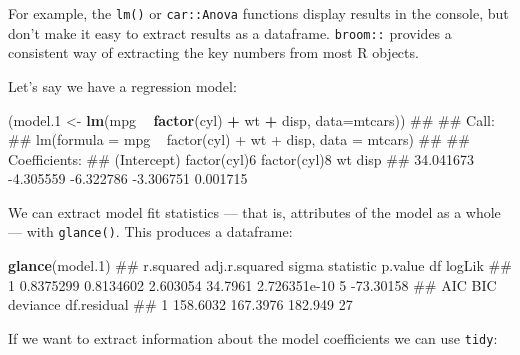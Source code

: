 \documentclass[]{article}
\newenvironment{Shaded}{\begin{snugshade}}{\end{snugshade}}
\newcommand{\KeywordTok}[1]{\textcolor[rgb]{0.13,0.29,0.53}{\textbf{#1}}}
\newcommand{\DataTypeTok}[1]{\textcolor[rgb]{0.13,0.29,0.53}{#1}}
\newcommand{\DecValTok}[1]{\textcolor[rgb]{0.00,0.00,0.81}{#1}}
\newcommand{\StringTok}[1]{\textcolor[rgb]{0.31,0.60,0.02}{#1}}
\newcommand{\OperatorTok}[1]{\textcolor[rgb]{0.81,0.36,0.00}{\textbf{#1}}}
\newcommand{\NormalTok}[1]{#1}
\theoremstyle{definition}
\theoremstyle{definition}
\theoremstyle{definition}
\theoremstyle{remark}
\begin{document}
For example, the \texttt{lm()} or \texttt{car::Anova} functions display
results in the console, but don't make it easy to extract results as a
dataframe. \texttt{broom::} provides a consistent way of extracting the
key numbers from most R objects.

Let's say we have a regression model:

\begin{Shaded}
\begin{Highlighting}[]
\NormalTok{(model.}\DecValTok{1}\NormalTok{ <-}\StringTok{ }\KeywordTok{lm}\NormalTok{(mpg }\OperatorTok{~}\StringTok{ }\KeywordTok{factor}\NormalTok{(cyl) }\OperatorTok{+}\StringTok{ }\NormalTok{wt }\OperatorTok{+}\StringTok{ }\NormalTok{disp, }\DataTypeTok{data=}\NormalTok{mtcars))}
\NormalTok{## }
\NormalTok{## Call:}
\NormalTok{## lm(formula = mpg ~ factor(cyl) + wt + disp, data = mtcars)}
\NormalTok{## }
\NormalTok{## Coefficients:}
\NormalTok{##  (Intercept)  factor(cyl)6  factor(cyl)8            wt          disp  }
\NormalTok{##    34.041673     -4.305559     -6.322786     -3.306751      0.001715}
\end{Highlighting}
\end{Shaded}

We can extract model fit statistics --- that is, attributes of the model
as a whole --- with \texttt{glance()}. This produces a dataframe:

\begin{Shaded}
\begin{Highlighting}[]
\KeywordTok{glance}\NormalTok{(model.}\DecValTok{1}\NormalTok{)}
\NormalTok{##   r.squared adj.r.squared    sigma statistic      p.value df    logLik}
\NormalTok{## 1 0.8375299     0.8134602 2.603054   34.7961 2.726351e-10  5 -73.30158}
\NormalTok{##        AIC      BIC deviance df.residual}
\NormalTok{## 1 158.6032 167.3976  182.949          27}
\end{Highlighting}
\end{Shaded}

If we want to extract information about the model coefficients we can
use \texttt{tidy}:

\begin{Shaded}
\end{Shaded}
\end{document}
